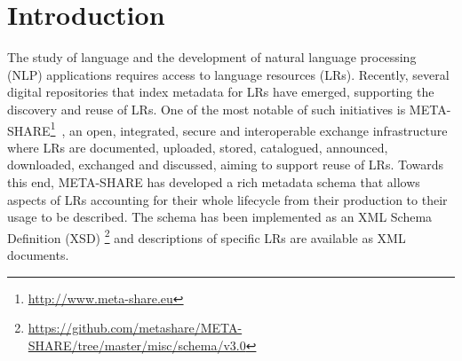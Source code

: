 \documentclass{llncs}
\begin{document}
\section{Introduction}
\label{sec:introduction}
The study of language and the development of natural language processing (NLP) applications requires access to language resources (LRs). %
Recently, several digital repositories that index metadata for LRs have emerged,
supporting the discovery and reuse of LRs. One of the most notable of such
initiatives is
META-SHARE\footnote{\url{http://www.meta-share.eu}}~\cite{piperidis2012meta}, an open,
integrated, secure and interoperable exchange infrastructure where LRs are
documented, uploaded, stored, catalogued, announced, downloaded, exchanged and
discussed, aiming to support reuse of LRs. Towards this end, META-SHARE has
developed a rich metadata schema that allows aspects of LRs accounting for their
whole lifecycle from their production to their usage to be described. The schema
has been implemented as an XML Schema Definition (XSD) \footnote{\url{https://github.com/metashare/META-SHARE/tree/master/misc/schema/v3.0}} and descriptions of specific LRs are available as XML documents.
\end{document}
